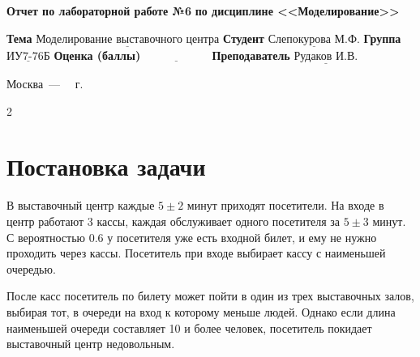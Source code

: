 \documentclass[12pt]{report}
\begin{document}
\begin{titlepage}
		\begin{center}
			\noindent\begin{minipage}{1.1\textwidth}\centering
				\Large\textbf{Отчет по лабораторной работе №6}\newline
				\textbf{по дисциплине <<Моделирование>>}\newline\newline
			\end{minipage}
		\end{center}
		
		\noindent\textbf{Тема} $\underline{\text{Моделирование выставочного центра}}$\newline\newline
		\noindent\textbf{Студент} $\underline{\text{Слепокурова М.Ф.}}$\newline\newline
		\noindent\textbf{Группа} $\underline{\text{ИУ7-76Б}}$\newline\newline
		\noindent\textbf{Оценка (баллы)} $\underline{\text{~~~~~~~~~~~~~~~~~}}$\newline\newline
		\noindent\textbf{Преподаватель} $\underline{\text{Рудаков И.В.}}$\newline\newline\newline
		
		\begin{center}
			\vfill
			Москва~---~\the\year
			~г.
		\end{center}
	\end{titlepage}

\setcounter{page} {2}


\section*{Постановка задачи}
В выставочный центр каждые $5\pm2$ минут приходят посетители. На входе в центр работают 3 кассы, каждая обслуживает одного посетителя за $5\pm3$ минут. С вероятностью 0.6 у посетителя уже есть входной билет, и ему не нужно проходить через кассы. Посетитель при входе выбирает кассу с наименьшей очередью.

После касс посетитель по билету может пойти в один из трех выставочных залов, выбирая тот, в очереди на вход к которому меньше людей. Однако если длина наименьшей очереди составляет 10 и более человек, посетитель покидает выставочный центр недовольным.
\end{document}
